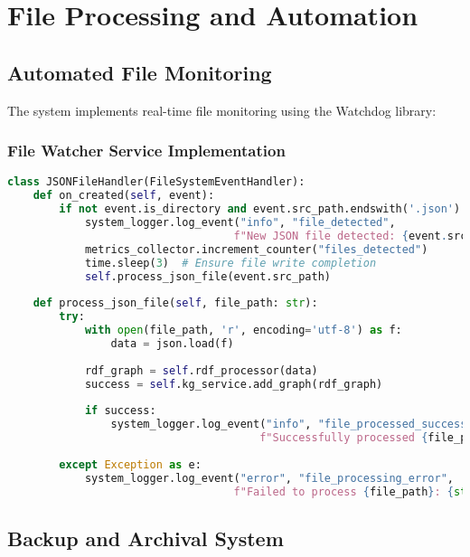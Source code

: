 \documentclass[12pt,a4paper]{article}
\begin{document}
\section{File Processing and Automation}

\subsection{Automated File Monitoring}

The system implements real-time file monitoring using the Watchdog library:

\subsubsection{File Watcher Service Implementation}

\begin{lstlisting}[language=python,caption=File Watcher Service Core Logic]
class JSONFileHandler(FileSystemEventHandler):
    def on_created(self, event):
        if not event.is_directory and event.src_path.endswith('.json'):
            system_logger.log_event("info", "file_detected", 
                                   f"New JSON file detected: {event.src_path}")
            metrics_collector.increment_counter("files_detected")
            time.sleep(3)  # Ensure file write completion
            self.process_json_file(event.src_path)
    
    def process_json_file(self, file_path: str):
        try:
            with open(file_path, 'r', encoding='utf-8') as f:
                data = json.load(f)
            
            rdf_graph = self.rdf_processor(data)
            success = self.kg_service.add_graph(rdf_graph)
            
            if success:
                system_logger.log_event("info", "file_processed_success",
                                       f"Successfully processed {file_path}")
            
        except Exception as e:
            system_logger.log_event("error", "file_processing_error",
                                   f"Failed to process {file_path}: {str(e)}")
\end{lstlisting}

\subsection{Backup and Archival System}
\end{document}
